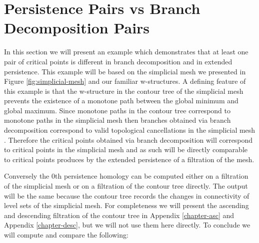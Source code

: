 \section{Persistence Pairs vs Branch Decomposition Pairs}

In this section we will present an example which demonstrates that at least one pair of critical points is different in branch decomposition and in extended persistence. This example will be based on the simplicial mesh we presented in Figure \ref{fig:simplicial-mesh} and our familiar w-structures. A defining feature of this example is that the w-structure in the contour tree of the simplicial mesh prevents the existence of a monotone path between the global minimum and global maximum. Since monotone paths in the contour tree correspond to monotone paths in the simplicial mesh \cite{ct-big-paper} then branches obtained via branch decomposition correspond to valid topological cancellations in the simplicial mesh \cite{ct-branch-decomp}. Therefore the critical points obtained via branch decomposition will correspond to critical points in the simplicial mesh and as such will be directly comparable to critical points produces by the extended persistence of a filtration of the mesh.

Conversely the 0th persistence homology can be computed either on a filtration of the simplicial mesh or on a filtration of the contour tree directly. The output will be the same because the contour tree records the changes in connectivity of level sets of the simplicial mesh. For completeness we will present the ascending and descending filtration of the contour tree in Appendix \ref{chapter-asc} and Appendix \ref{chapter-desc}, but we will not use them here directly. To conclude we will compute and compare the following:

